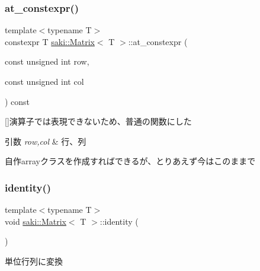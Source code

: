 \subsubsection{\texorpdfstring{at\+\_\+constexpr()}{at\_constexpr()}}
{\footnotesize\ttfamily template$<$typename T$>$ \\
constexpr T \mbox{\hyperlink{classsaki_1_1_matrix}{saki\+::\+Matrix}}$<$ T $>$\+::at\+\_\+constexpr (\begin{DoxyParamCaption}\item[{const unsigned int}]{row,  }\item[{const unsigned int}]{col }\end{DoxyParamCaption}) const\hspace{0.3cm}{\ttfamily [inline]}}



\mbox{[}\mbox{]}演算子では表現できないため、普通の関数にした 


\begin{DoxyParams}{引数}
{\em row,col} & 行、列\\
\hline
\end{DoxyParams}
自作arrayクラスを作成すればできるが、とりあえず今はこのままで \mbox{\label{classsaki_1_1_matrix_af0c4f3614c29e27eae5fecde22140be8}} 
\subsubsection{\texorpdfstring{identity()}{identity()}}
{\footnotesize\ttfamily template$<$typename T$>$ \\
void \mbox{\hyperlink{classsaki_1_1_matrix}{saki\+::\+Matrix}}$<$ T $>$\+::identity (\begin{DoxyParamCaption}{ }\end{DoxyParamCaption})\hspace{0.3cm}{\ttfamily [inline]}}



単位行列に変換 

\mbox{\label{classsaki_1_1_matrix_aae1ffee9f67e7c9893a2329c75bd8a51}} 
